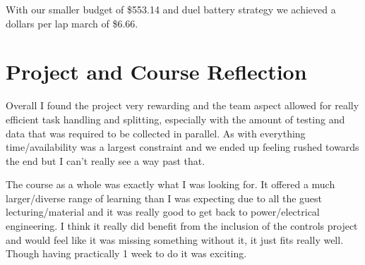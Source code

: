 \documentclass[11pt]{article}
\begin{document}
With our smaller budget of \$553.14 and duel battery strategy we achieved a dollars per lap march of \$6.66.

\section*{Project and Course Reflection}
Overall I found the project very rewarding and the team aspect allowed for really efficient task handling and splitting, especially with the amount of testing and data that was required to be collected in parallel. As with everything time/availability was a largest constraint and we ended up feeling rushed towards the end but I can't really see a way past that. 

The course as a whole was exactly what I was looking for. It offered a much larger/diverse range of learning than I was expecting due to all the guest lecturing/material and it was really good to get back to power/electrical engineering. I think it really did benefit from the inclusion of the controls project and would feel like it was missing something without it, it just fits really well. Though having practically 1 week to do it was exciting.       
\end{document}
